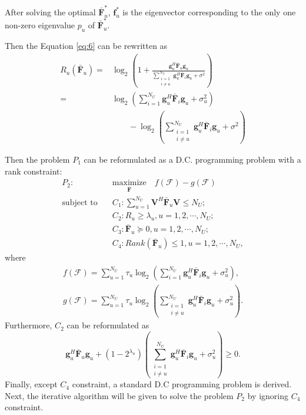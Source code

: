 \documentclass[10pt,journal,twocolumn,twoside]{IEEEtran}
\begin{document}
After solving the optimal $\bar{\bm{F}}_u^*$, $\bm{f}_{u}^*$ is the eigenvector corresponding to the only one non-zero eigenvalue $p_u$ of $\bar{\bm{F}}_u^*$.

Then the Equation \eqref{eq:6} can be rewritten as 
\begin{align}\label{eq:newR}
R_u(\bar{\bm{F}}_u) =& \log_2\left(1+\frac{\bm{g}_{u}^H \bar{\bm{F}}_u\bm{g}_{u}}{\sum_{\substack{i=1 \\ i\neq u}}^{N_U}{\bm{g}}_{u}^H\bar{\bm{F}}_i\bm{g}_u+\sigma^2}\right)\\
=&\log_2\left(\sum_{i=1}^{N_U}\bm{g}_{u}^H \bar{\bm{F}}_i\bm{g}_{u} + \sigma_u^2\right) \nonumber\\
&\qquad -\log_2\left(\sum_{\substack{i=1 \\ i\neq u}}^{N_U}{\bm{g}}_{u}^H\bar{\bm{F}}_i\bm{g}_u+\sigma^2 \right) \nonumber
\end{align}

Then the problem $P_1$ can be reformulated as a D.C. programming problem with a rank constraint:
\begin{align}\label{eq:maxR}
P_2: \quad&\underset{\bar{\bm{F}}}{\text{maximize}}\quad f(\bm{\mathcal{F}}) - g(\bm{\mathcal{F}})\\ \nonumber
\text{subject to} \quad&C_1: \sum_{u=1}^{N_U}\bm{V}^H \bar{\bm{F}}_u\bm{V} \leq N_U;\nonumber\\
&C_2: R_{u}\geq \lambda_{u}, u = 1,2,\cdots, N_U;\nonumber\\
&C_3: \bar{\bm{F}}_{u} \succeq 0, u = 1,2,\cdots, N_U; \nonumber\\
&C_4: Rank(\bm{\bar{F}}_{u})\leq 1, u = 1,2,\cdots, N_U, \nonumber
\end{align}
where
\begin{align}
	f(\bm{\mathcal{F}}) = \sum_{u=1}^{N_U}\tau_u\log_2\left(\sum_{i=1}^{N_U}\bm{g}_{u}^H \bar{\bm{F}}_i\bm{g}_{u} + \sigma_u^2\right),\\
    g(\bm{\mathcal{F}}) = \sum_{u=1}^{N_U}\tau_u \log_2\left(\sum_{\substack{i=1 \\ i\neq u}}^{N_U}{\bm{g}}_{u}^H\bar{\bm{F}}_i\bm{g}_u+\sigma_u^2 \right).
\end{align}
Furthermore, $C_2$ can be reformulated as
\begin{equation}
	\bm{g}_{u}^H \bar{\bm{F}}_u\bm{g}_{u} + (1-2^{\lambda_{u}}) \left( \sum_{\substack{i=1 \\ i\neq u}}^{N_U} \bm{g}_{u}^H \bar{\bm{F}}_i\bm{g}_{u} + \sigma_u^2 \right) \geq 0.
\end{equation} 
Finally, except $C_4$ constraint, a standard D.C programming problem is derived. Next, the iterative algorithm will be given to solve the problem $P_2$ by ignoring $C_4$ constraint. 
\end{document}
